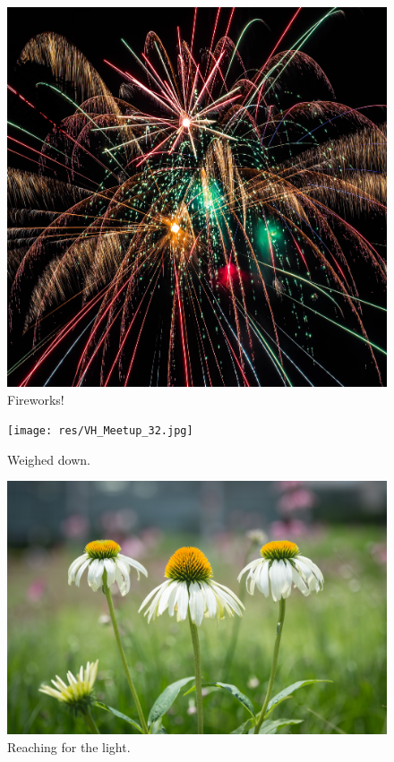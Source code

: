 \documentclass{report}
\begin{document}
\begin{figure}
  \includegraphics[width=\linewidth]{res/fireworks.jpg}
  \caption{Fireworks!}
\end{figure}

\begin{figure}
  \texttt{[image: res/VH\_Meetup\_32.jpg]}
  \caption{Weighed down.}
\end{figure}

\begin{figure}
  \includegraphics[width=\linewidth]{res/symmetricalflowers.jpg}
  \caption{Reaching for the light.}
\end{figure}
\end{document}

